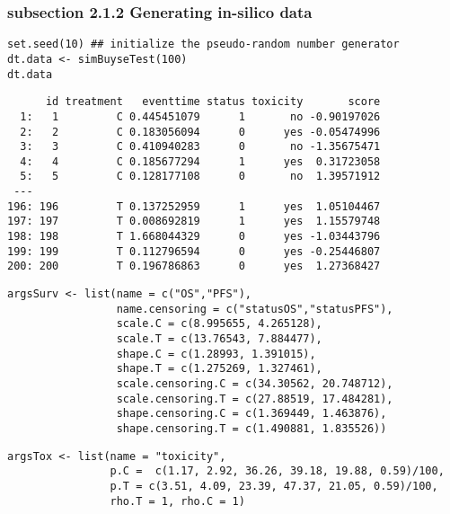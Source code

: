 \documentclass[12pt]{article}
\begin{document}
\subsubsection{subsection 2.1.2 Generating in-silico data}
\label{sec:orgffc3fe8}
\lstset{language=r,label= ,caption= ,captionpos=b,numbers=none}
\begin{lstlisting}
set.seed(10) ## initialize the pseudo-random number generator 
dt.data <- simBuyseTest(100)
dt.data
\end{lstlisting}

\begin{verbatim}
      id treatment   eventtime status toxicity       score
  1:   1         C 0.445451079      1       no -0.90197026
  2:   2         C 0.183056094      0      yes -0.05474996
  3:   3         C 0.410940283      0       no -1.35675471
  4:   4         C 0.185677294      1      yes  0.31723058
  5:   5         C 0.128177108      0       no  1.39571912
 ---                                                      
196: 196         T 0.137252959      1      yes  1.05104467
197: 197         T 0.008692819      1      yes  1.15579748
198: 198         T 1.668044329      0      yes -1.03443796
199: 199         T 0.112796594      0      yes -0.25446807
200: 200         T 0.196786863      0      yes  1.27368427
\end{verbatim}

\lstset{language=r,label= ,caption= ,captionpos=b,numbers=none}
\begin{lstlisting}
argsSurv <- list(name = c("OS","PFS"),
                 name.censoring = c("statusOS","statusPFS"),
                 scale.C = c(8.995655, 4.265128),
                 scale.T = c(13.76543, 7.884477),
                 shape.C = c(1.28993, 1.391015),
                 shape.T = c(1.275269, 1.327461),
                 scale.censoring.C = c(34.30562, 20.748712),
                 scale.censoring.T = c(27.88519, 17.484281),
                 shape.censoring.C = c(1.369449, 1.463876),
                 shape.censoring.T = c(1.490881, 1.835526))
\end{lstlisting}

\lstset{language=r,label= ,caption= ,captionpos=b,numbers=none}
\begin{lstlisting}
argsTox <- list(name = "toxicity",
                p.C =  c(1.17, 2.92, 36.26, 39.18, 19.88, 0.59)/100,
                p.T = c(3.51, 4.09, 23.39, 47.37, 21.05, 0.59)/100,
                rho.T = 1, rho.C = 1)
\end{lstlisting}
\end{document}
